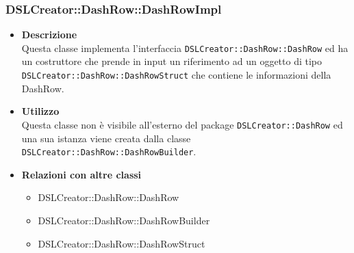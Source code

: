  \subsubsection{DSLCreator::DashRow::DashRowImpl}
                    \begin{itemize}
                        \item \textbf{Descrizione} \hfill \\
                            Questa classe implementa l'interfaccia \texttt{DSLCreator::DashRow::DashRow} ed ha un costruttore che prende in input un riferimento ad un oggetto di tipo \texttt{DSLCreator::Dash\-Row::DashRowStruct} che contiene le informazioni della DashRow.
                        \item \textbf{Utilizzo} \hfill \\
                            Questa classe non è visibile all'esterno del package \texttt{DSLCreator::DashRow} ed una sua istanza viene creata dalla classe \texttt{DSLCreator::DashRow::DashRowBuilder}.
                        \item \textbf{Relazioni con altre classi}
                            \begin{itemize}
                              \item DSLCreator::DashRow::DashRow
                              \item DSLCreator::DashRow::DashRowBuilder
                              \item DSLCreator::DashRow::DashRowStruct
                            \end{itemize}
                    \end{itemize}

